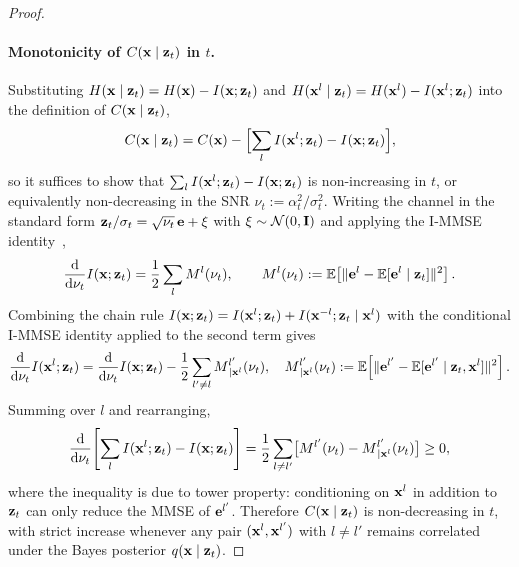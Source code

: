 \documentclass{article}
\begin{document}
\begin{proof}
\paragraph{Monotonicity of $C({\mathbf x}\mid{\mathbf z}_t)$ in $t$.}
Substituting $H({\mathbf x}\mid{\mathbf z}_t) = H({\mathbf x}) - I({\mathbf x};{\mathbf z}_t)$ and $H({\mathbf x}^l\mid{\mathbf z}_t) = H({\mathbf x}^l) - I({\mathbf x}^l;{\mathbf z}_t)$ into the definition of $C({\mathbf x}\mid{\mathbf z}_t)$,
\begin{align}
    C({\mathbf x}\mid{\mathbf z}_t) = C({\mathbf x}) - \Bigl[\sum_l I({\mathbf x}^l;{\mathbf z}_t) - I({\mathbf x};{\mathbf z}_t)\Bigr],
\end{align}
so it suffices to show that $\sum_l I({\mathbf x}^l;{\mathbf z}_t) - I({\mathbf x};{\mathbf z}_t)$ is non-increasing in $t$, or equivalently non-decreasing in the SNR $\nu_t := \alpha_t^2/\sigma_t^2$. Writing the channel in the standard form ${\mathbf z}_t/\sigma_t = \sqrt{\nu_t}\,{\mathbf e} + \xi$ with $\xi \sim \mathcal{N}(0, {\mathbf I})$ and applying the I-MMSE identity~\citep{guo2005mutual},
\begin{align}
    \frac{{\mathrm{d}}}{{\mathrm{d}}\nu_t} I({\mathbf x};{\mathbf z}_t) = \frac{1}{2} \sum_l M^l(\nu_t),
    \qquad M^l(\nu_t) := \mathbb{E}\!\left[\|{\mathbf e}^l - \mathbb{E}[{\mathbf e}^l\mid{\mathbf z}_t]\|^2\right].
\end{align}
Combining the chain rule $I({\mathbf x};{\mathbf z}_t) = I({\mathbf x}^l;{\mathbf z}_t) + I({\mathbf x}^{-l};{\mathbf z}_t\mid{\mathbf x}^l)$ with the conditional I-MMSE identity applied to the second term gives
\begin{align}
    \frac{{\mathrm{d}}}{{\mathrm{d}}\nu_t} I({\mathbf x}^l;{\mathbf z}_t) = \frac{{\mathrm{d}}}{{\mathrm{d}}\nu_t} I({\mathbf x};{\mathbf z}_t) - \frac{1}{2}\sum_{l' \neq l} M^{l'}_{\,\mid{\mathbf x}^l}(\nu_t),
    \quad M^{l'}_{\,\mid{\mathbf x}^l}(\nu_t) := \mathbb{E}\!\left[\|{\mathbf e}^{l'} - \mathbb{E}[{\mathbf e}^{l'}\mid{\mathbf z}_t,{\mathbf x}^l]\|^2\right].
\end{align}
Summing over $l$ and rearranging,
\begin{align}
    \frac{{\mathrm{d}}}{{\mathrm{d}}\nu_t}\!\left[\sum_l I({\mathbf x}^l;{\mathbf z}_t) - I({\mathbf x};{\mathbf z}_t)\right]
    = \frac{1}{2}\sum_{l \neq l'}\bigl[M^{l'}(\nu_t) - M^{l'}_{\,\mid{\mathbf x}^l}(\nu_t)\bigr] \geq 0,
\end{align}
where the inequality is due to tower property: conditioning on ${\mathbf x}^l$ in addition to ${\mathbf z}_t$ can only reduce the MMSE of ${\mathbf e}^{l'}$. Therefore $C({\mathbf x}\mid{\mathbf z}_t)$ is non-decreasing in $t$, with strict increase whenever any pair $({\mathbf x}^l,{\mathbf x}^{l'})$ with $l \ne l'$ remains correlated under the Bayes posterior $q({\mathbf x}\mid{\mathbf z}_t)$.
\end{proof}

\clearpage

%
%
%
%

%
%
%

%
%

%


%
%
%
%
%
%
%
%
%
%
%
%
%
%
%
%
%
%
%
\end{document}
